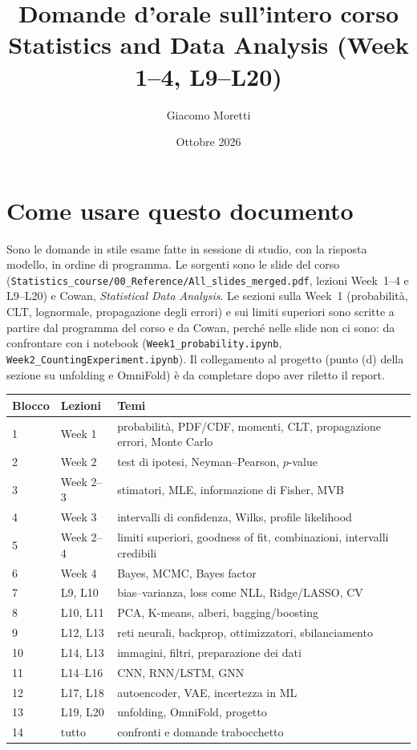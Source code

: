 \documentclass[11pt,a4paper]{article}
\title{Domande d'orale sull'intero corso\\Statistics and Data Analysis (Week 1--4, L9--L20)}
\author{Giacomo Moretti}
\date{Ottobre 2026}
\newcommand{\code}[1]{\texttt{#1}}
\begin{document}
\maketitle

\section*{Come usare questo documento}
Sono le domande in stile esame fatte in sessione di studio, con la risposta modello, in ordine di programma.
Le sorgenti sono le slide del corso (\code{Statistics\_course/00\_Reference/All\_slides\_merged.pdf}, lezioni Week~1--4 e L9--L20) e Cowan, \emph{Statistical Data Analysis}.
Le sezioni sulla Week~1 (probabilit\`a, CLT, lognormale, propagazione degli errori) e sui limiti superiori sono scritte a partire dal programma del corso e da Cowan, perch\'e nelle slide non ci sono: da confrontare con i notebook (\code{Week1\_probability.ipynb}, \code{Week2\_CountingExperiment.ipynb}).
Il collegamento al progetto (punto (d) della sezione su unfolding e OmniFold) \`e da completare dopo aver riletto il report.

\begin{center}
\begin{tabular}{p{1.8cm}p{5.2cm}p{7cm}}
\toprule
Blocco & Lezioni & Temi \\
\midrule
1 & Week 1 & probabilit\`a, PDF/CDF, momenti, CLT, propagazione errori, Monte Carlo \\
2 & Week 2 & test di ipotesi, Neyman--Pearson, $p$-value \\
3 & Week 2--3 & stimatori, MLE, informazione di Fisher, MVB \\
4 & Week 3 & intervalli di confidenza, Wilks, profile likelihood \\
5 & Week 2--4 & limiti superiori, goodness of fit, combinazioni, intervalli credibili \\
6 & Week 4 & Bayes, MCMC, Bayes factor \\
7 & L9, L10 & bias--varianza, loss come NLL, Ridge/LASSO, CV \\
8 & L10, L11 & PCA, K-means, alberi, bagging/boosting \\
9 & L12, L13 & reti neurali, backprop, ottimizzatori, sbilanciamento \\
10 & L14, L13 & immagini, filtri, preparazione dei dati \\
11 & L14--L16 & CNN, RNN/LSTM, GNN \\
12 & L17, L18 & autoencoder, VAE, incertezza in ML \\
13 & L19, L20 & unfolding, OmniFold, progetto \\
14 & tutto & confronti e domande trabocchetto \\
\bottomrule
\end{tabular}
\end{center}
\end{document}
